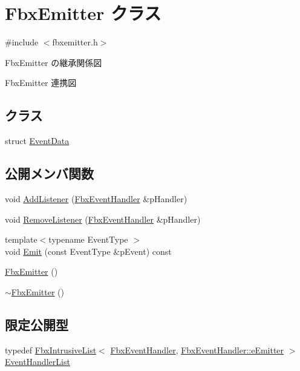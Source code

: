 \hypertarget{class_fbx_emitter}{}\section{Fbx\+Emitter クラス}
\label{class_fbx_emitter}


{\ttfamily \#include $<$fbxemitter.\+h$>$}



Fbx\+Emitter の継承関係図


Fbx\+Emitter 連携図
\subsection*{クラス}
\begin{DoxyCompactItemize}
\item 
struct \hyperlink{struct_fbx_emitter_1_1_event_data}{Event\+Data}
\end{DoxyCompactItemize}
\subsection*{公開メンバ関数}
\begin{DoxyCompactItemize}
\item 
void \hyperlink{class_fbx_emitter_ab8022a1fd620467f12f493673cfa16a9}{Add\+Listener} (\hyperlink{class_fbx_event_handler}{Fbx\+Event\+Handler} \&p\+Handler)
\item 
void \hyperlink{class_fbx_emitter_a9d5e8f773a85bd9f7a88d9f01eb5463d}{Remove\+Listener} (\hyperlink{class_fbx_event_handler}{Fbx\+Event\+Handler} \&p\+Handler)
\item 
{\footnotesize template$<$typename Event\+Type $>$ }\\void \hyperlink{class_fbx_emitter_ad541e3b06c0beeab71fcf066fc44c78d}{Emit} (const Event\+Type \&p\+Event) const
\item 
\hyperlink{class_fbx_emitter_a33a5aeaa15dd8c9fa66a97b3ab5db550}{Fbx\+Emitter} ()
\item 
\hyperlink{class_fbx_emitter_a58a10b2780c916dedd3ddbbf7ad62f3a}{$\sim$\+Fbx\+Emitter} ()
\end{DoxyCompactItemize}
\subsection*{限定公開型}
\begin{DoxyCompactItemize}
\item 
typedef \hyperlink{class_fbx_intrusive_list}{Fbx\+Intrusive\+List}$<$ \hyperlink{class_fbx_event_handler}{Fbx\+Event\+Handler}, \hyperlink{class_fbx_event_handler_a47139da2cfd5abee91664d75c4fb577cae2c0d7da494cef8d787ee3495e24a6c0}{Fbx\+Event\+Handler\+::e\+Emitter} $>$ \hyperlink{class_fbx_emitter_a9ac3cddf1a246e71957e4b7db6c08fc1}{Event\+Handler\+List}
\end{DoxyCompactItemize}
